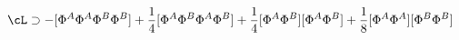 \begin{equation}
\cL \supset - [\Phi^A \Phi^A \Phi^B \Phi^B] + \frac{1}{4} [\Phi^A \Phi^B
\Phi^A \Phi^B] + \frac{1}{4} [\Phi^A \Phi^B] [\Phi^A \Phi^B] +
\frac{1}{8} [\Phi^A \Phi^A] [\Phi^B \Phi^B]
\end{equation}

